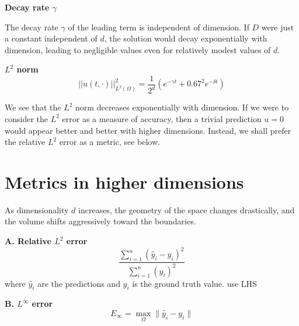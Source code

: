 \textbf{Decay rate $\gamma$}

The decay rate $\gamma$ of the leading term is independent of dimension.
If $D$ were just a constant independent of $d$, the solution would decay exponentially with dimension,
leading to negligible values even for relatively modest values of $d$.

\textbf{$L^2$ norm}
$$
||u(t,\cdot)||_{L^2(\Omega)}^2 =
\frac{1}{2^d}
\left(
e^{-\gamma t}
+
0.67^2
e^{-\delta t}
\right)
$$

We see that the $L^2$ norm decreases exponentially with dimension.
If we were to consider the $L^2$ error as a measure of accuracy,
then a trivial prediction $u=0$ would appear better and better with higher dimensions.
Instead, we shall prefer the relative $L^2$ error as a metric, see below.






\section{Metrics in higher dimensions}

As dimensionality $d$ increases, the geometry of the space changes drastically,
and the volume shifts aggressively toward the boundaries.


\textbf{A. Relative $L^2$ error}
$$
\frac{
\sum_{i=1}^n(\hat y_i - y_i)^2
}{
\sum_{i=1}^n(y_i)^2
}
$$
where $\hat y_i$ are the predictions and $y_i$ is the ground truth value.
use LHS

\textbf{B. $L^\infty$ error}
$$
E_\infty = \max_\Omega\|\hat{y}_i - y_i\|
$$


